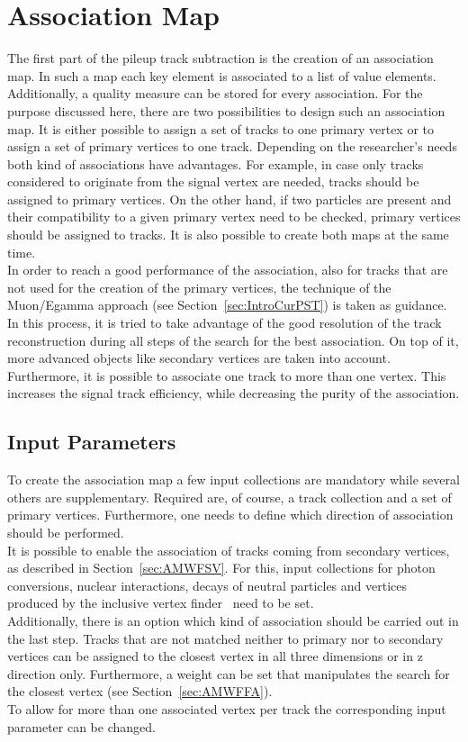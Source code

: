 \chapter{Association Map \label{sec:AssMap}}

The first part of the pileup track subtraction is the creation of an association map. In such a map each key element is associated to a list of value elements. Additionally, a quality measure can be stored for every association. For the purpose discussed here, there are two possibilities to design such an association map. It is either possible to assign a set of tracks to one primary vertex or to assign a set of primary vertices to one track. Depending on the researcher's needs both kind of associations have advantages. For example, in case only tracks considered to originate from the signal vertex are needed, tracks should be assigned to primary vertices. On the other hand, if two particles are present and their compatibility to a given  primary vertex need to be checked, primary vertices should be assigned to tracks. It is also possible to create both maps at the same time.\\
In order to reach a good performance of the association, also for tracks that are not used for the creation of the primary vertices, the technique of the Muon/Egamma approach (see Section~\ref{sec:IntroCurPST}) is taken as guidance. In this process, it is tried to take advantage of the good resolution of the track reconstruction during all steps of the search for the best association. On top of it, more advanced objects like secondary vertices are taken into account.\\
Furthermore, it is possible to associate one track to more than one vertex. This increases the signal track efficiency, while decreasing the purity of the association.

\section{Input Parameters \label{sec:AMInColl}}

To create the association map a few input collections are mandatory while several others are supplementary. Required are, of course, a track collection and a set of primary vertices. Furthermore, one needs to define which direction of association should be performed. \\
It is possible to enable the association of tracks coming from secondary vertices, as described in Section~\ref{sec:AMWFSV}. For this, input collections for photon conversions, nuclear interactions, decays of neutral particles and vertices produced by the inclusive vertex finder~\cite{ivfPaper} need to be set. \\
Additionally, there is an option which kind of association should be carried out in the last step. Tracks that are not matched neither to primary nor to secondary vertices can be assigned to the closest vertex in all three dimensions or in z direction only. Furthermore, a weight can be set that manipulates the search for the closest vertex (see Section~\ref{sec:AMWFFA}). \\
To allow for more than one associated vertex per track the corresponding input parameter can be changed.

